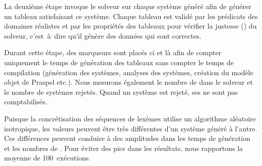 La deuxième étape invoque le solveur sur chaque système généré afin de générer
un tableau satisfaisant ce système. Chaque tableau est validé par les prédicats
des domaines réalistes et par les propriétés des tableaux pour vérifier la
justesse () du solveur, c'est~à~dire qu'il génère des
données qui sont correctes.

Durant cette étape, des marqueurs sont placés ci et là afin de compter
uniquement le temps de génération des tableaux sans compter le temps de
compilation (génération des systèmes, analyses des systèmes, création du modèle
objet de Praspel etc.). Nous mesurons également le nombre de
 dans le solveur et le nombre de systèmes rejetés. Quand
un système est rejeté, ses  ne sont pas comptabilisés.

Puisque la concrétisation des séquences de lexèmes utilise un algorithme
aléatoire isotropique, les valeurs peuvent être très
différentes d'un système généré à l'autre. Ces différences peuvent conduire à
des amplitudes dans les temps de génération et les nombres de
. Pour éviter des pics dans les résultats, nous
rapportons la moyenne de 100~exécutions.


